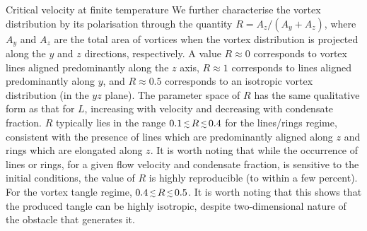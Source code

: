\begin{chapter}{\label{cha:nonequib}Critical velocity at finite temperature}
We further characterise the vortex distribution by its polarisation through the quantity $R=A_z/(A_y+A_z)$, where $A_y$ and $A_z$ are the total area of vortices when the vortex distribution is projected along the $y$ and $z$ directions, respectively.  A value $R \approx 0$ corresponds to vortex lines aligned predominantly along the $z$ axis, $R\approx 1$ corresponds to lines aligned predominantly along $y$, and $R\approx 0.5$ corresponds to an isotropic vortex distribution (in the $yz$ plane).  The parameter space of $R$ has the same qualitative form as that for $L$, increasing with velocity and decreasing with condensate fraction. $R$ typically lies in the range $0.1 \,\mbox{\footnotesize$\lesssim$}\, R\,\mbox{\footnotesize$\lesssim$}\, 0.4$ for the lines/rings regime, consistent with the presence of lines which are predominantly aligned along $z$ and rings which are elongated along $z$.  It is worth noting that while the occurrence of lines or rings, for a given flow velocity and condensate fraction, is sensitive to the initial conditions, the value of $R$ is highly reproducible (to within a few percent).       For the vortex tangle regime, $0.4 \,\mbox{\footnotesize$\lesssim$}\, R\,\mbox{\footnotesize$\lesssim$}\, 0.5$.  It is worth noting that this shows that the produced tangle can be highly isotropic, despite two-dimensional nature of the obstacle that generates it.


\end{chapter}
